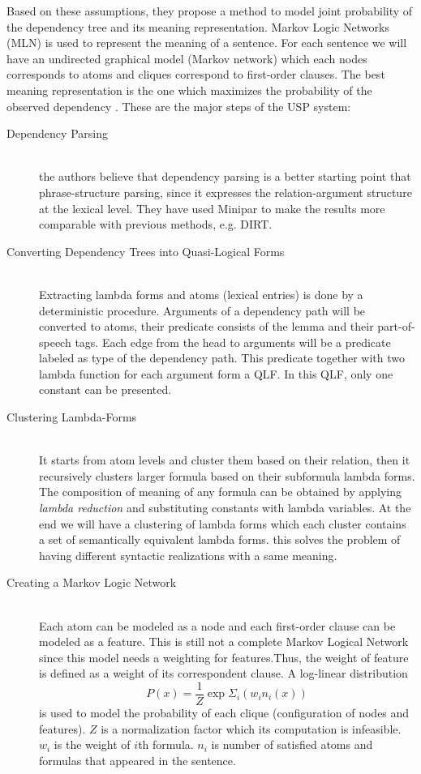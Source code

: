 \documentclass[12pt]{report}
\begin{document}
Based on these assumptions, they propose a method to model joint probability of the dependency tree
and its meaning representation. Markov Logic Networks (MLN) \cite{Richardson2006} is used to represent the meaning of a sentence.
For each sentence we will have an undirected graphical model (Markov network) which each nodes corresponds to atoms
and cliques correspond to first-order clauses. The best meaning representation is the one which 
maximizes the probability of the observed dependency \cite{Titov2011}.
These are the major steps of the USP system:
\begin{description}
  \item[Dependency Parsing] \hfill \\
  the authors believe that dependency parsing is a better starting point that phrase-structure parsing, since it expresses
   the relation-argument structure at the lexical level. They have used Minipar \cite{Lin2002} to make the results more comparable with previous
   methods, e.g. DIRT.
  \item[Converting Dependency Trees into Quasi-Logical Forms] \hfill \\
  Extracting lambda forms and atoms (lexical entries) is done by a deterministic procedure. 
  Arguments of a dependency path will be converted to atoms, their predicate consists of the lemma and their part-of-speech tags.
  Each edge from the head to arguments will be a predicate labeled as type of the dependency path.
  This predicate together with two lambda function for each argument form a QLF. In this QLF, only one constant can be presented.
  
  \item[Clustering Lambda-Forms] \hfill \\
  It starts from atom levels and cluster them based on their relation, then it recursively clusters larger formula
  based on their subformula lambda forms. The composition of meaning of any formula can be obtained by applying
  \emph{lambda reduction} and substituting constants with lambda variables. At the end we will have a clustering
  of lambda forms which each cluster contains a set of semantically equivalent lambda forms. this solves
   the problem of having different syntactic realizations with a same meaning.
  
  \item[Creating a Markov Logic Network] \hfill \\
  Each atom can be modeled as a node and each first-order clause can be modeled as a feature. This is still not a complete Markov Logical
  Network since this model needs a weighting for features.Thus, the weight of feature is defined as a weight of
  its correspondent clause. A log-linear distribution 
  $$ P(x) = \frac{1}{Z}\exp{\Sigma_i{(w_i n_i (x))}} $$
  is used to model the probability of each clique (configuration of nodes and features).
  $Z$ is a normalization factor which its computation is infeasible. $w_i$ is the weight of $i$th formula.
  $n_i$ is number of satisfied atoms and formulas that appeared in the sentence. 
   

\end{description}
\end{document}
